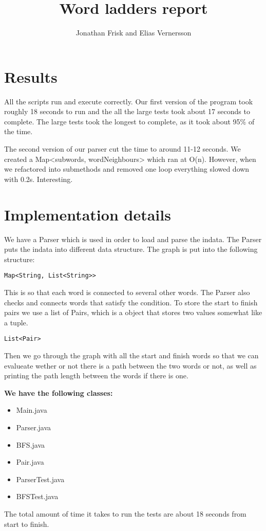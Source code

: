 \documentclass{article}
\title{Word ladders report}
\author{Jonathan Frisk and Elias Vernersson}
\begin{document}
  \maketitle

  \section{Results}

  
  \par All the scripts run and execute correctly. Our first version of the program took roughly 18 seconds to run and the all the large tests took about 17 seconds to complete. The large tests took the longest to complete, as it took about 95\% of the time.
  \par The second version of our parser cut the time to around 11-12 seconds. We created a Map<subwords, wordNeighbours> which ran at O(n). However, when we refactored into submethods and removed one loop everything slowed down with 0.2s. Interesting.
  
  
  \section{Implementation details}


  \par We have a Parser which is used in order to load and parse the indata. The Parser puts the indata into different data structure. The graph is put into the following structure:
\begin{lstlisting}
Map<String, List<String>>
\end{lstlisting}
This is so that each word is connected to several other words. The Parser also checks and connects words that satisfy the condition. To store the start to finish pairs we use a list of Pairs, which is a object that stores two values somewhat like a tuple.
\begin{lstlisting}
List<Pair>
\end{lstlisting}
Then we go through the graph with all the start and finish words so that we can evalueate wether or not there is a path between the two words or not, as well as printing the path length between the words if there is one.

  \textbf{We have the following classes:}
  \begin{itemize}
  \item Main.java
  \item Parser.java
  \item BFS.java
  \item Pair.java
  \item ParserTest.java
  \item BFSTest.java   
  \end{itemize}

  \par The total amount of time it takes to run the tests are about 18 seconds from start to finish.
\end{document}
